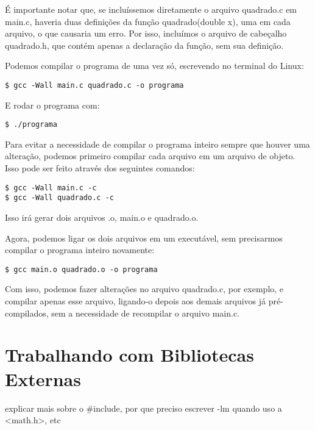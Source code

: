 É importante notar que, se incluíssemos diretamente o arquivo quadrado.c em main.c, haveria duas definições da função quadrado(double x), uma em cada arquivo, o que causaria um erro. Por isso, incluímos o arquivo de cabeçalho quadrado.h, que contém apenas a declaração da função, sem sua definição. 

Podemos compilar o programa de uma vez só, escrevendo no terminal do Linux:
\begin{scriptsize}
\estilobash
\begin{lstlisting}
$ gcc -Wall main.c quadrado.c -o programa
\end{lstlisting}
\end{scriptsize}

E rodar o programa com:
\begin{scriptsize}
\estilobash
\begin{lstlisting}
$ ./programa
\end{lstlisting}
\end{scriptsize}

Para evitar a necessidade de compilar o programa inteiro sempre que houver uma alteração, podemos primeiro compilar cada arquivo em um arquivo de objeto. Isso pode ser feito através dos seguintes comandos:
\begin{scriptsize}
\estilobash
\begin{lstlisting}
$ gcc -Wall main.c -c
$ gcc -Wall quadrado.c -c
\end{lstlisting}
\end{scriptsize}

Isso irá gerar dois arquivos .o, main.o e quadrado.o.

Agora, podemos ligar os dois arquivos em um executável, sem precisarmos compilar o programa inteiro novamente:
\begin{scriptsize}
\estilobash
\begin{lstlisting}
$ gcc main.o quadrado.o -o programa
\end{lstlisting}
\end{scriptsize}

Com isso, podemos fazer alterações no arquivo quadrado.c, por exemplo, e compilar apenas esse arquivo, ligando-o depois aos demais arquivos já pré-compilados, sem a necessidade de recompilar o arquivo main.c.


\section{Trabalhando com Bibliotecas Externas}
explicar mais sobre o \#include, por que preciso escrever -lm quando uso a <math.h>, etc

